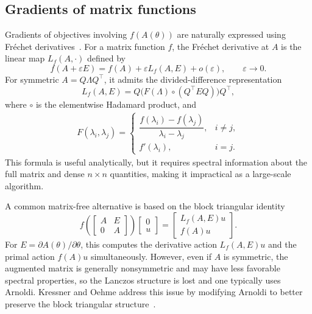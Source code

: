 \documentclass{article}
\begin{document}
\subsection{Gradients of matrix functions}
\label{subsec:bg_matrix_function_gradients}

Gradients of objectives involving \(f(A(\theta))\) are naturally expressed using
Fr\'echet derivatives~\citep{higham2008functions}. For a matrix function \(f\), the Fr\'echet derivative at \(A\) is
the linear map \(L_f(A,\cdot)\) defined by 
\begin{equation}
    f(A+\varepsilon E)
    =
    f(A)+\varepsilon L_f(A,E)+o(\varepsilon),
    \qquad \varepsilon\to 0 .
    \label{eq:bg_frechet_def}
\end{equation}
For symmetric \(A=Q\Lambda Q^\top\), it admits the divided-difference representation
\citep{higham2008functions}
\begin{equation}
    L_f(A,E)
    =
    Q\bigl(F(\Lambda)\circ (Q^\top E Q)\bigr)Q^\top ,
    \label{eq:bg_hadamard_frechet}
\end{equation}
where $\circ$ is the elementwise Hadamard product, and
\begin{align}
    F(\lambda_i,\lambda_j)
    =
    \begin{cases}
        \dfrac{f(\lambda_i)-f(\lambda_j)}{\lambda_i-\lambda_j}, & i\neq j,\\[1.2ex]
        f'(\lambda_i), & i=j.
    \end{cases}
\label{eq:bg_divided_difference}
\end{align}
This formula is useful analytically, but it requires spectral information about the full
matrix and dense \(n\times n\) quantities, making it impractical as a large-scale
algorithm.

A common matrix-free alternative is based on the block triangular identity
\citep{higham2008functions,najfeld1995derivatives}
\begin{equation}
    f\!\left(
    \begin{bmatrix}
        A & E\\
        0 & A
    \end{bmatrix}
    \right)
    \begin{bmatrix}
        0\\ u
    \end{bmatrix}
    =
    \begin{bmatrix}
        L_f(A,E)u\\
        f(A)u
    \end{bmatrix}.
    \label{eq:bg_block_action}
\end{equation}
For \(E=\partial A(\theta)/\partial\theta\), this computes the derivative action
\(L_f(A,E)u\) and the primal action \(f(A)u\) simultaneously. However, even if \(A\) is
symmetric, the augmented matrix is generally nonsymmetric and may have less favorable
spectral properties, so the Lanczos structure is lost and one typically uses Arnoldi.
Kressner and Oehme address this issue by modifying Arnoldi to better preserve the block
triangular structure~\citep{kressner2026}.
\end{document}
